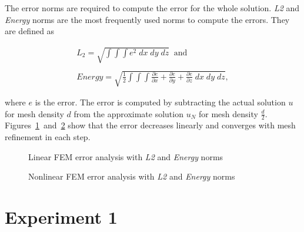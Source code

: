 The error norms are required to compute the error for the whole solution. \textit{L2} and \textit{Energy} norms are the most frequently used norms to compute the errors. They are defined as

\begin{equation}
\begin{array}{l}
L_{2} = \sqrt{\int\int\int e^2 \; dx \; dy \; dz} \;\;\text{and} \\
\\
Energy = \sqrt{ \frac{1}{2} \int\int\int \frac{\partial{e}}{\partial{x}} + \frac{\partial{e}}{\partial{y}} + \frac{\partial{e}}{\partial{z}} \;  dx \; dy \; dz},
\end{array}
\label{eqn:norms}
\end{equation}

\noindent where $e$ is the error. The error is computed by subtracting the actual solution $u$ for mesh density $d$ from the approximate solution $u_{N}$ for mesh density $\frac{d}{2}$. Figures~\ref{fig:errlinnorm}~and~\ref{fig:errnonlinnorm} show that the error decreases linearly and converges with mesh refinement in each step.


\begin{figure}
\centerline{}
\caption{Linear FEM error analysis with \textit{L2} and \textit{Energy} norms}
\label{fig:errlinnorm}
\end{figure}

\begin{figure}
\centerline{}
\caption{Nonlinear FEM error analysis with \textit{L2} and \textit{Energy} norms}
\label{fig:errnonlinnorm}
\end{figure}


\clearpage
\section{Experiment 1}
\label{i}

